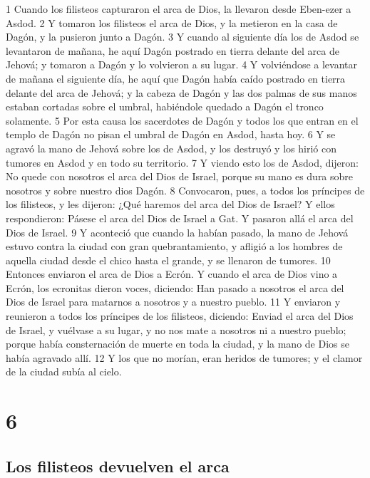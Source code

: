 1 Cuando los filisteos capturaron el arca de Dios, la llevaron desde Eben-ezer a Asdod.
2 Y tomaron los filisteos el arca de Dios, y la metieron en la casa de Dagón, y la pusieron junto a Dagón.
3 Y cuando al siguiente día los de Asdod se levantaron de mañana, he aquí Dagón postrado en tierra delante del arca de Jehová; y tomaron a Dagón y lo volvieron a su lugar.
4 Y volviéndose a levantar de mañana el siguiente día, he aquí que Dagón había caído postrado en tierra delante del arca de Jehová; y la cabeza de Dagón y las dos palmas de sus manos estaban cortadas sobre el umbral, habiéndole quedado a Dagón el tronco solamente.
5 Por esta causa los sacerdotes de Dagón y todos los que entran en el templo de Dagón no pisan el umbral de Dagón en Asdod, hasta hoy.
6 Y se agravó la mano de Jehová sobre los de Asdod, y los destruyó y los hirió con tumores en Asdod y en todo su territorio.
7 Y viendo esto los de Asdod, dijeron: No quede con nosotros el arca del Dios de Israel, porque su mano es dura sobre nosotros y sobre nuestro dios Dagón.
8 Convocaron, pues, a todos los príncipes de los filisteos, y les dijeron: ¿Qué haremos del arca del Dios de Israel? Y ellos respondieron: Pásese el arca del Dios de Israel a Gat. Y pasaron allá el arca del Dios de Israel.
9 Y aconteció que cuando la habían pasado, la mano de Jehová estuvo contra la ciudad con gran quebrantamiento, y afligió a los hombres de aquella ciudad desde el chico hasta el grande, y se llenaron de tumores.
10 Entonces enviaron el arca de Dios a Ecrón. Y cuando el arca de Dios vino a Ecrón, los ecronitas dieron voces, diciendo: Han pasado a nosotros el arca del Dios de Israel para matarnos a nosotros y a nuestro pueblo.
11 Y enviaron y reunieron a todos los príncipes de los filisteos, diciendo: Enviad el arca del Dios de Israel, y vuélvase a su lugar, y no nos mate a nosotros ni a nuestro pueblo; porque había consternación de muerte en toda la ciudad, y la mano de Dios se había agravado allí.
12 Y los que no morían, eran heridos de tumores; y el clamor de la ciudad subía al cielo.

\chapter{6}

\section*{Los filisteos devuelven el arca}


